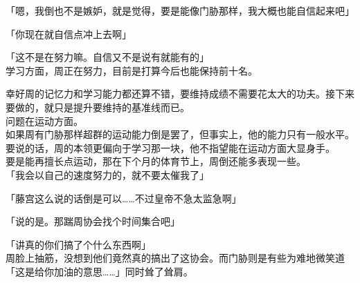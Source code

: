 「嗯，我倒也不是嫉妒，就是觉得，要是能像门胁那样，我大概也能自信起来吧」

「你现在就自信点冲上去啊」

「这不是在努力嘛。自信又不是说有就能有的」\\

学习方面，周正在努力，目前是打算今后也能保持前十名。

幸好周的记忆力和学习能力都还算不错，要维持成绩不需要花太大的功夫。接下来要做的，就只是提升要维持的基准线而已。\\

问题在运动方面。\\

如果周有门胁那样超群的运动能力倒是罢了，但事实上，他的能力只有一般水平。要说的话，周的本领更偏向于学习那一块，他不指望能在运动方面大显身手。\\

要是能再擅长点运动，那在下个月的体育节上，周倒还能多表现一些。\\

「我会以自己的速度努力的，就不要太催我了」

「藤宫这么说的话倒是可以……不过皇帝不急太监急啊」

「说的是。那踹周协会找个时间集合吧」

「讲真的你们搞了个什么东西啊」\\

周脸上抽筋，没想到他们竟然真的搞出了这协会。而门胁则是有些为难地微笑道「这是给你加油的意思……」同时耸了耸肩。
